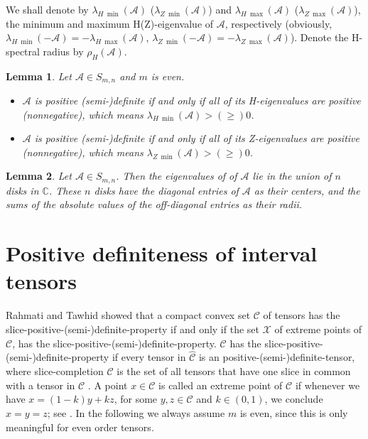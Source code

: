 \documentclass[twoside]{article}
\newtheorem{lemma}{Lemma}[section]
\begin{document}
We shall denote by $\lambda_{H~\min}(\mathcal{A})$ ($\lambda_{Z~\min}(\mathcal{A})$) and $\lambda_{H~\max}(\mathcal{A})$ ($\lambda_{Z~\max}(\mathcal{A})$), the minimum and maximum H(Z)-eigenvalue of $\mathcal{A}$, respectively (obviously, $\lambda_{H~\min}(-\mathcal{A})=-\lambda_{H~\max}(\mathcal{A})$, $\lambda_{Z~\min}(-\mathcal{A})=-\lambda_{Z~\max}(\mathcal{A})$). Denote the H-spectral radius by $\rho_H(\mathcal{A})$.


\begin{lemma}\label{HP}\textup{\cite{qi2005}}
Let $\mathcal{A}\in S_{m,n}$ and $m$ is even.
\begin{itemize}
  \item [(a)] $\mathcal{A}$ is positive (semi-)definite if and only if all of its H-eigenvalues are positive (nonnegative), which means $\lambda_{H~\min}(\mathcal{A})>(\geq)0$.
  \item [(b)] $\mathcal{A}$ is positive (semi-)definite if and only if all of its Z-eigenvalues are positive (nonnegative), which means $\lambda_{Z~\min}(\mathcal{A})>(\geq)0$.
\end{itemize}
\end{lemma}


\begin{lemma}\label{Cth}\textup{\cite{ql2017}}
Let $\mathcal{A}\in S_{m,n}$. Then the eigenvalues of of $\mathcal{A}$ lie in the union of $n$ disks in $\mathbb{C}$. These $n$ disks have the diagonal entries of $\mathcal{A}$ as their centers, and the sums of the absolute values of the off-diagonal entries as their radii.
\end{lemma}

\vspace{.3cm}

\section{Positive definiteness of interval tensors}
\setcounter{section}{3}

Rahmati and Tawhid showed that a compact convex set $\mathcal{C}$ of tensors has the slice-positive-(semi-)definite-property if
and only if the set $\mathcal{X}$ of extreme points of $\mathcal{C}$, has the slice-positive-(semi-)definite-property. $\mathcal{C}$ has the slice-positive-(semi-)definite-property if every tensor in $\hat{\mathcal{C}}$ is an positive-(semi-)definite-tensor, where slice-completion $\hat{\mathcal{C}}$ is the set of all tensors that have one slice in common with a tensor in $\mathcal{C}$ \cite{sr2020}.
A point $x \in\mathcal{C}$ is called an extreme point of $\mathcal{C}$ if whenever we have $x =(1-k)y + k z$, for some $y, z \in \mathcal{C}$ and $k \in (0, 1)$, we conclude $x = y = z$; see \cite{spm}. In the following we always assume $m$ is even, since this is only meaningful for even order tensors.
\end{document}
